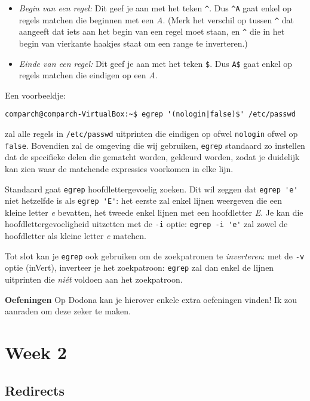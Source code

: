 \documentclass[a4paper,twoside,openany]{memoir}
\begin{document}
\begin{itemize}
  \item \emph{Begin van een regel:} Dit geef je aan met het teken \verb!^!. Dus
    \verb!^A! gaat enkel op regels matchen die beginnen met een \emph{A}. (Merk
    het verschil op tussen \verb!^! dat aangeeft dat iets aan het begin
    van een regel moet staan, en \verb!^! die in het begin van vierkante haakjes
    staat om een range te inverteren.)

  \item \emph{Einde van een regel:} Dit geef je aan met het teken \verb!$!. Dus
    \verb!A$! gaat enkel op regels matchen die eindigen op een \emph{A}.

\end{itemize}

Een voorbeeldje:

\begin{verbatim}
comparch@comparch-VirtualBox:~$ egrep '(nologin|false)$' /etc/passwd
\end{verbatim}

zal alle regels in \verb!/etc/passwd! uitprinten die eindigen op ofwel
\verb!nologin! ofwel op \verb!false!. Bovendien zal de omgeving die wij
gebruiken, \verb!egrep! standaard zo instellen dat de specifieke delen die
gematcht worden, gekleurd worden, zodat je duidelijk kan zien waar de matchende
expressies voorkomen in elke lijn.

Standaard gaat \verb!egrep! hoofdlettergevoelig zoeken. Dit wil zeggen dat \verb!egrep 'e'! niet hetzelfde is als \verb!egrep 'E'!: het eerste zal enkel lijnen weergeven die een kleine letter \emph{e} bevatten, het tweede enkel lijnen met een hoofdletter \emph{E}. Je kan die hoofdlettergevoeligheid uitzetten met de \verb!-i! optie: \verb!egrep -i 'e'! zal zowel de hoofdletter als kleine letter \emph{e} matchen.

Tot slot kan je \verb!egrep! ook gebruiken om de zoekpatronen te \emph{inverteren}: met de \verb!-v! optie (inVert), inverteer je het zoekpatroon: \verb!egrep! zal dan enkel de lijnen uitprinten die \emph{ni\'et} voldoen aan het zoekpatroon.

\textbf{Oefeningen} Op Dodona kan je hierover enkele extra oefeningen vinden! Ik zou aanraden om deze zeker te maken.

\part{Week 2}

\chapter{Redirects}
\end{document}
